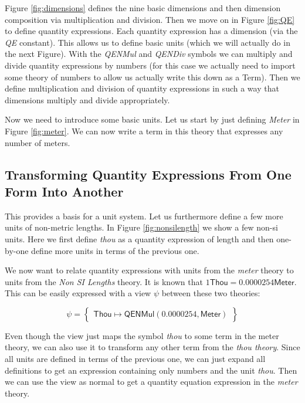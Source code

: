 



Figure \ref{fig:dimensions} defines the nine basic dimensions and then dimension composition via multiplication and division. Then we move on in Figure \ref{fig:QE} to define quantity expressions. Each quantity expression has a dimension (via the \textit{QE} constant). This allows us to define basic units (which we will actually do in the next Figure). With the \textit{QENMul} and \textit{QENDiv} symbols we can multiply and divide quantity expressions by numbers (for this case we actually need to import some theory of numbers to allow us actually write this down as a Term). Then we define multiplication and division of quantity expressions in such a way that dimensions multiply and divide appropriately.

Now we need to introduce some basic units. Let us start by just defining \textit{Meter} in Figure \ref{fig:meter}. We can now write a term in this theory that expresses any number of meters.



\subsection{Transforming Quantity Expressions From One Form Into Another}
\label{sec:qeconv}

This provides a basis for a unit system. Let us furthermore define a few more units of non-metric lengths. In Figure \ref{fig:nonsilength} we show a few non-si units. Here we first define \textit{thou} as a quantity expression of length and then one-by-one define more units in terms of the previous one.


We now want to relate quantity expressions with units from the \textit{meter} theory to units from the \textit{Non SI Lengths} theory. It is known that $1 \mathsf{Thou} = 0.0000254 \mathsf{Meter}$. This can be easily expressed with a view $\psi$ between these two theories:

\[
\psi = \left\{\begin{array}{l}
  \mathsf{Thou} \mapsto \mathsf{QENMul} \left( 0.0000254, \mathsf{Meter} \right)
\end{array}\right\}
\]

Even though the view just maps the symbol \textit{thou} to some term in the meter theory, we can also use it to transform any other term from the \textit{thou theory}. Since all units are defined in terms of the previous one, we can just expand all definitions to get an expression containing only numbers and the unit \textit{thou}. Then we can use the view as normal to get a quantity equation expression in the \textit{meter} theory.
